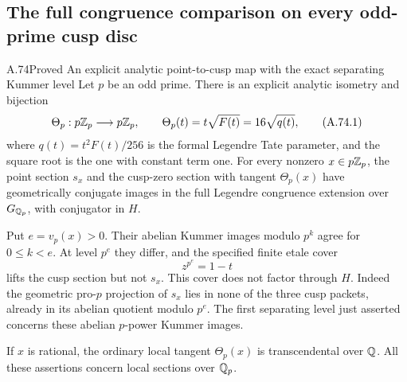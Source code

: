 \subsection{The full congruence comparison on every odd-prime cusp disc}

\begin{statement}{A.74}{Proved}
{An explicit analytic point-to-cusp map with the exact separating Kummer level}
Let $p$ be an odd prime.  There is an explicit analytic isometry
and bijection
\[
 \Theta_p:p\mathbb Z_p\longrightarrow p\mathbb Z_p,\qquad
 \Theta_p(t)=t\sqrt{F(t)}=16\sqrt{q(t)},
\tag{A.74.1}
\]
where $q(t)=t^2F(t)/256$ is the formal Legendre Tate parameter,
and the square root is the one with constant term one.
For every nonzero $x\in p\mathbb Z_p$, the point section $s_x$ and
the cusp-zero section with tangent $\Theta_p(x)$ have
geometrically conjugate images in the full Legendre
congruence extension over $G_{\mathbb Q_p}$, with conjugator in $H$.

Put $e=v_p(x)>0$.  Their abelian Kummer images modulo $p^k$
agree for $0\le k<e$.  At level $p^e$ they differ, and the
specified finite etale cover
\[
                         z^{p^e}=1-t
\tag{A.74.2}
\]
lifts the cusp section but not $s_x$.
This cover does not factor through $H$.
Indeed the geometric pro-$p$ projection of $s_x$ lies in none
of the three cusp packets, already in its abelian quotient
modulo $p^e$.
The first separating level just asserted concerns these
abelian $p$-power Kummer images.

If $x$ is rational, the ordinary local tangent $\Theta_p(x)$
is transcendental over $\mathbb Q$.
All these assertions concern local sections over $\mathbb Q_p$.
\end{statement}
